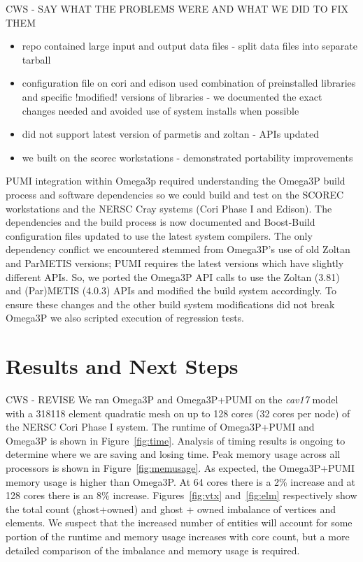\documentclass[a4paper]{article}
\begin{document}
CWS - SAY WHAT THE PROBLEMS WERE AND WHAT WE DID TO FIX THEM
\begin{itemize}
  \item repo contained large input and output data files - split data files into separate tarball
  \item configuration file on cori and edison used combination of preinstalled
    libraries and specific !modified! versions of libraries - we documented the
    exact changes needed and avoided use of system installs when possible
  \item did not support latest version of parmetis and zoltan - APIs updated 
  \item we built on the scorec workstations - demonstrated portability improvements
\end{itemize}

PUMI integration within Omega3p required understanding the Omega3P build process
and software dependencies so we could build and test on the SCOREC workstations
and the NERSC Cray systems (Cori Phase I and Edison).
The dependencies and the build process is now documented and Boost-Build
configuration files updated to use the latest system compilers.
The only dependency conflict we encountered stemmed from Omega3P's use of old
Zoltan and ParMETIS versions; PUMI requires the latest versions which have
slightly different APIs.
So, we ported the Omega3P API calls to use the Zoltan (3.81) and
(Par)METIS (4.0.3) APIs and modified the build system accordingly.
To ensure these changes and the other build system modifications did not break
Omega3P we also scripted execution of regression tests.

\section{Results and Next Steps}\label{sec:results}

CWS - REVISE
We ran Omega3P and Omega3P+PUMI on the \textit{cav17} model with a 318118
element quadratic mesh on up to 128 cores (32 cores per node) of the NERSC Cori
Phase I system.
The runtime of Omega3P+PUMI and Omega3P is shown in Figure~\ref{fig:time}.
Analysis of timing results is ongoing to determine where we are saving and
losing time.
Peak memory usage across all processors is shown in
Figure~\ref{fig:memusage}.
As expected, the Omega3P+PUMI memory usage is higher than Omega3P.
At 64 cores there is a 2\% increase and at 128 cores there is an 8\% increase.
Figures~\ref{fig:vtx} and~\ref{fig:elm} respectively show the total count
(ghost+owned) and ghost + owned imbalance of vertices and
elements.
We suspect that the increased number of entities will account for some portion
of the runtime and memory usage increases with core count, but a more detailed
comparison of the imbalance and memory usage is required.
\end{document}
